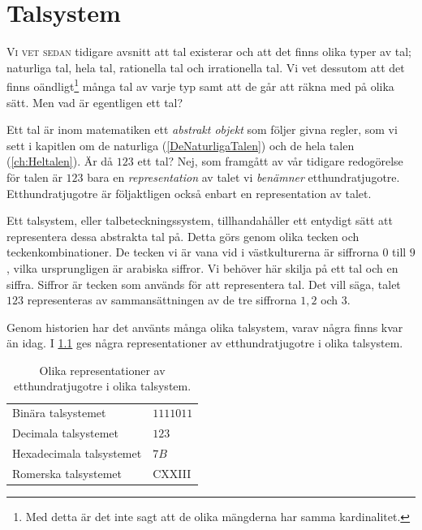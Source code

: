 \chapter{Talsystem}
\label{ch:Talsystem}
\lettrine{V}{i vet sedan} tidigare avsnitt att tal existerar och att det finns
olika typer av tal; naturliga tal, hela tal, rationella tal och irrationella
tal.
Vi vet dessutom att det finns oändligt\footnote{Med detta är det inte sagt att
de olika mängderna har samma kardinalitet.} många tal av varje typ samt att de
går att räkna med på olika sätt.
Men vad är egentligen ett tal?

Ett tal är inom matematiken ett \emph{abstrakt objekt} som följer givna regler,
som vi sett i kapitlen om de naturliga (\cref{DeNaturligaTalen}) och de hela 
talen (\cref{ch:Heltalen}).
Är då \(123\) ett tal?
Nej, som framgått av vår tidigare redogörelse för talen är \(123\) bara en 
\emph{representation} av talet vi \emph{benämner} etthundratjugotre.
Etthundratjugotre är följaktligen också enbart en representation av talet.

Ett talsystem, eller
talbeteckningssystem, tillhandahåller ett entydigt
sätt att representera dessa abstrakta tal på.
Detta görs genom olika tecken och teckenkombinationer.
De tecken vi är vana vid i västkulturerna är siffrorna \(0\) till \(9\), vilka 
ursprungligen är arabiska siffror.
Vi behöver här skilja på ett tal och en siffra.
Siffror är tecken som används för att representera tal.
Det vill säga, talet \(123\) representeras av sammansättningen av de tre
siffrorna \(1,2\) och \(3\).

Genom historien har det använts många olika talsystem, varav några finns kvar
än idag.
I \cref{tbl:OlikaEtthundratjugotre} ges några representationer av
etthundratjugotre i olika talsystem.

\begin{table}
  \caption{%
    Olika representationer av etthundratjugotre i olika talsystem.
  }\label{tbl:OlikaEtthundratjugotre}
  \begin{tabular}{ll}
    \toprule
    Binära talsystemet & \(1111011\) \\
    Decimala talsystemet & \(123\) \\
    Hexadecimala talsystemet & \(7B\) \\
    Romerska talsystemet & CXXIII \\
    \bottomrule
  \end{tabular}
\end{table}

